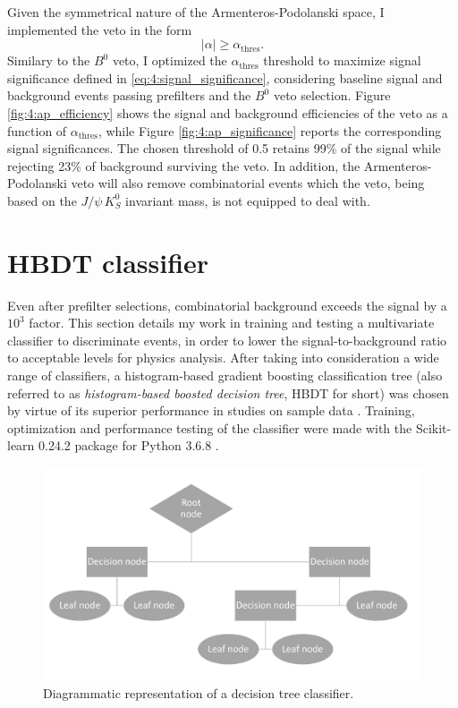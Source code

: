 Given the symmetrical nature of the Armenteros-Podolanski space, I implemented the veto in the form
\begin{equation}
|\alpha| \geq \alpha_\text{thres}.
\end{equation}
Similary to the $B^0$ veto, I optimized the $\alpha_\text{thres}$ threshold to maximize \demonstratorshort signal significance defined in \eqref{eq:4:signal_significance}, considering baseline signal and background events passing prefilters and the $B^0$ veto selection.
Figure \ref{fig:4:ap_efficiency} shows the signal and background efficiencies of the veto as a function of $\alpha_\text{thres}$, while Figure \ref{fig:4:ap_significance} reports the corresponding signal significances.
The chosen threshold of 0.5 retains 99\% of the \demonstratorshort signal while rejecting 23\% of \physbkgshort background surviving the \bz veto.
In addition, the Armenteros-Podolanski veto will also remove combinatorial \kshortdecay events which the \bz veto, being based on the $J/\psi\,K_S^0$ invariant mass, is not equipped to deal with.

\section{HBDT classifier}
\label{sec:HBDT}
Even after prefilter selections, combinatorial background exceeds the signal by a ${10}^3$ factor.
This section details my work in training and testing a multivariate classifier to discriminate \demonstratorshort events, in order to lower the signal-to-background ratio to acceptable levels for physics analysis.
After taking into consideration a wide range of classifiers, a histogram-based gradient boosting classification tree (also referred to as \textit{histogram-based boosted decision tree}, HBDT for short) was chosen by virtue of its superior performance in studies on sample data \cite{Pessina:BSc:2020}.
Training, optimization and performance testing of the classifier were made with the Scikit-learn 0.24.2 package \cite{scikit-learn} for Python 3.6.8 \cite{10.5555/1593511}.

\begin{figure}
	\centering
	\includegraphics[height=.3\textheight]{graphics/04-event_selection/decision_tree.pdf}
	\caption{Diagrammatic representation of a decision tree classifier.}
	\label{fig:4:decision_tree}
\end{figure}

